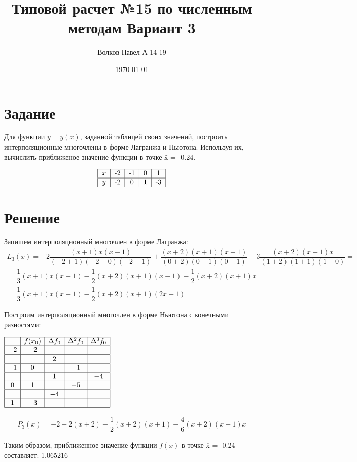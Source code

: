 \documentclass[a4paper,12pt]{report} %
\author{Волков Павел А-14-19}
\title{Типовой расчет №15 по численным методам Вариант 3}
\date{\today}
\begin{document}

\maketitle

\newpage
\section*{Задание}

Для функции $y = y(x)$, заданной таблицей своих значений, построить интерполяционные многочлены в форме Лагранжа и Ньютона. Используя их, вычислить приближеное значение функции в точке \~ x = -0.24.

\[
\begin{tabular}{ | c | c | c | c | c |}
	\hline
	$x$ & -2 & -1 & 0 & 1  \\ \hline
	$y$ & -2 & 0 & 1 & -3  \\ \hline
\end{tabular}
\]

\section*{Решение}

Запишем интерполяционный многочлен в форме Лагранжа:
\begin{multline}
	L_3(x) = -2\dfrac{(x + 1)x(x - 1)}{(-2 + 1)(-2 - 0)(-2 - 1)} + \dfrac{(x + 2)(x + 1)(x - 1)}{(0 + 2)(0 + 1)(0 - 1)} 
	- 3\dfrac{(x + 2)(x + 1)x}{(1 + 2)(1 + 1)(1 - 0)} = \\ = \dfrac{1}{3}(x + 1) x (x - 1) - \dfrac{1}{2}(x + 2)(x + 1)(x - 1)
	- \dfrac{1}{2}(x + 2)(x+1)x = \\ = \dfrac{1}{3}(x + 1) x (x - 1) - \dfrac{1}{2}(x + 2)(x + 1)(2x - 1)
\end{multline}

Построим интерполяционный многочлен в форме Ньютона с конечными разностями:

$
\begin{array}{| c | c | c | c | c |}
	\hline
	& f(x_0) & \Delta f_0 & \Delta^2 f_0 & \Delta^3 f_0  \\ \hline
	-2 & -2 &&& \\ \hline
	&&2&& \\ \hline
	-1 & 0 &&-1& \\ \hline
	&&1&&-4 \\ \hline
	0 & 1 &&-5& \\ \hline
	&&-4&& \\ \hline
	1 & -3 &&&\\ \hline
\end{array}
$

\begin{multline}
	P_3(x) = -2 + 2(x + 2) - \dfrac{1}{2}(x + 2)(x + 1) - \dfrac{4}{6}(x + 2)(x + 1)x
\end{multline}

Таким образом, приближенное значение функции $f(x)$ в точке  \~ x = -0.24 составляет: 1.065216
\end{document}
